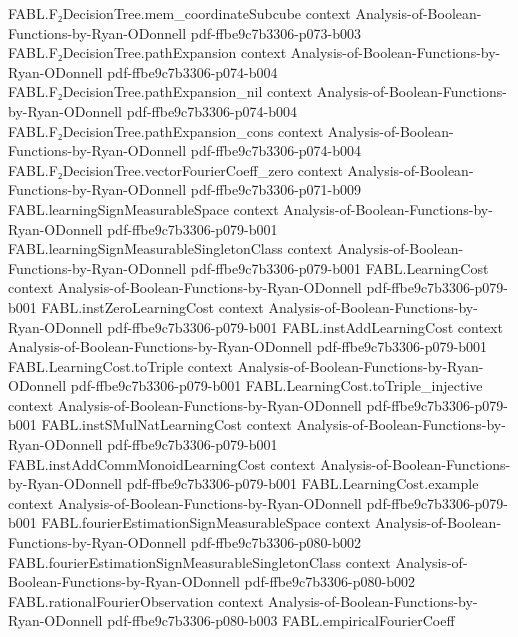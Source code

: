 \begin{theorem}
\proofstep
  {FABL.F₂DecisionTree.mem_coordinateSubcube}
  {context}
  {Analysis-of-Boolean-Functions-by-Ryan-ODonnell}
  {pdf-ffbe9c7b3306-p073-b003}
\proofstep
  {FABL.F₂DecisionTree.pathExpansion}
  {context}
  {Analysis-of-Boolean-Functions-by-Ryan-ODonnell}
  {pdf-ffbe9c7b3306-p074-b004}
\proofstep
  {FABL.F₂DecisionTree.pathExpansion_nil}
  {context}
  {Analysis-of-Boolean-Functions-by-Ryan-ODonnell}
  {pdf-ffbe9c7b3306-p074-b004}
\proofstep
  {FABL.F₂DecisionTree.pathExpansion_cons}
  {context}
  {Analysis-of-Boolean-Functions-by-Ryan-ODonnell}
  {pdf-ffbe9c7b3306-p074-b004}
\proofstep
  {FABL.F₂DecisionTree.vectorFourierCoeff_zero}
  {context}
  {Analysis-of-Boolean-Functions-by-Ryan-ODonnell}
  {pdf-ffbe9c7b3306-p071-b009}
\proofstep
  {FABL.learningSignMeasurableSpace}
  {context}
  {Analysis-of-Boolean-Functions-by-Ryan-ODonnell}
  {pdf-ffbe9c7b3306-p079-b001}
\proofstep
  {FABL.learningSignMeasurableSingletonClass}
  {context}
  {Analysis-of-Boolean-Functions-by-Ryan-ODonnell}
  {pdf-ffbe9c7b3306-p079-b001}
\proofstep
  {FABL.LearningCost}
  {context}
  {Analysis-of-Boolean-Functions-by-Ryan-ODonnell}
  {pdf-ffbe9c7b3306-p079-b001}
\proofstep
  {FABL.instZeroLearningCost}
  {context}
  {Analysis-of-Boolean-Functions-by-Ryan-ODonnell}
  {pdf-ffbe9c7b3306-p079-b001}
\proofstep
  {FABL.instAddLearningCost}
  {context}
  {Analysis-of-Boolean-Functions-by-Ryan-ODonnell}
  {pdf-ffbe9c7b3306-p079-b001}
\proofstep
  {FABL.LearningCost.toTriple}
  {context}
  {Analysis-of-Boolean-Functions-by-Ryan-ODonnell}
  {pdf-ffbe9c7b3306-p079-b001}
\proofstep
  {FABL.LearningCost.toTriple_injective}
  {context}
  {Analysis-of-Boolean-Functions-by-Ryan-ODonnell}
  {pdf-ffbe9c7b3306-p079-b001}
\proofstep
  {FABL.instSMulNatLearningCost}
  {context}
  {Analysis-of-Boolean-Functions-by-Ryan-ODonnell}
  {pdf-ffbe9c7b3306-p079-b001}
\proofstep
  {FABL.instAddCommMonoidLearningCost}
  {context}
  {Analysis-of-Boolean-Functions-by-Ryan-ODonnell}
  {pdf-ffbe9c7b3306-p079-b001}
\proofstep
  {FABL.LearningCost.example}
  {context}
  {Analysis-of-Boolean-Functions-by-Ryan-ODonnell}
  {pdf-ffbe9c7b3306-p079-b001}
\proofstep
  {FABL.fourierEstimationSignMeasurableSpace}
  {context}
  {Analysis-of-Boolean-Functions-by-Ryan-ODonnell}
  {pdf-ffbe9c7b3306-p080-b002}
\proofstep
  {FABL.fourierEstimationSignMeasurableSingletonClass}
  {context}
  {Analysis-of-Boolean-Functions-by-Ryan-ODonnell}
  {pdf-ffbe9c7b3306-p080-b002}
\proofstep
  {FABL.rationalFourierObservation}
  {context}
  {Analysis-of-Boolean-Functions-by-Ryan-ODonnell}
  {pdf-ffbe9c7b3306-p080-b003}
\proofstep
  {FABL.empiricalFourierCoeff}

\end{theorem}
